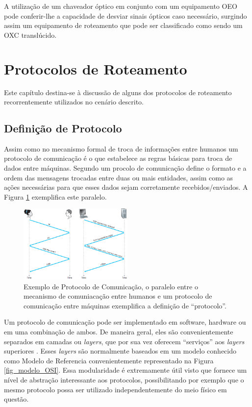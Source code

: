 A utilização de um chaveador óptico em conjunto com um equipamento OEO pode conferir-lhe a capacidade de desviar sinais ópticos caso necessário, surgindo assim um equipamento de roteamento que pode ser classificado como sendo um OXC translúcido.

\section{Protocolos de Roteamento}
\label{cap_protocolos_de_roteamento}
Este capítulo destina-se à discussão de alguns dos protocolos de roteamento recorrentemente utilizados no cenário descrito.

\subsection{Definição de Protocolo}
Assim como no mecanismo formal de troca de informações entre humanos um protocolo de comunicação é o que estabelece as regras básicas para troca de dados entre máquinas. Segundo \cite{Book-Kurose2013} um procolo de comunicação define o formato e a ordem das mensagens trocadas entre duas ou mais entidades, assim como as ações necessárias para que esses dados sejam corretamente recebidos/enviados. A Figura \ref{fig_explicacao_protocolo} exemplifica este paralelo.

\begin{figure}[!htb]
	\centering
	\includegraphics[width=0.5\textwidth]{./figuras/Explicacao-Protocolo.png} %
	\caption[Exemplo de Protocolo de Comunicação]{Exemplo de Protocolo de Comunicação, o paralelo entre o mecanismo de comuniacação entre humanos e um protocolo de comunicação entre máquinas exemplifica a definição de ``protocolo''.}
	\label{fig_explicacao_protocolo}
\end{figure}

Um protocolo de comunicação pode ser implementado em software, hardware ou em uma combinação de ambos. De maneira geral, eles são convenientemente separados em camadas ou \emph{layers}, que por sua vez oferecem ``serviços'' aos \emph{layers} superiores \cite{Book-Kurose2013}. Esses \emph{layers} são normalmente baseados em um modelo conhecido como Modelo de Referencia  convenientemente representado na Figura \ref{fig_modelo_OSI}. Essa modularidade é extremamente útil visto que fornece um nível de abstração interessante aos protocolos, possibilitando por exemplo que o mesmo protocolo possa ser utilizado independentemente do meio físico em questão.

